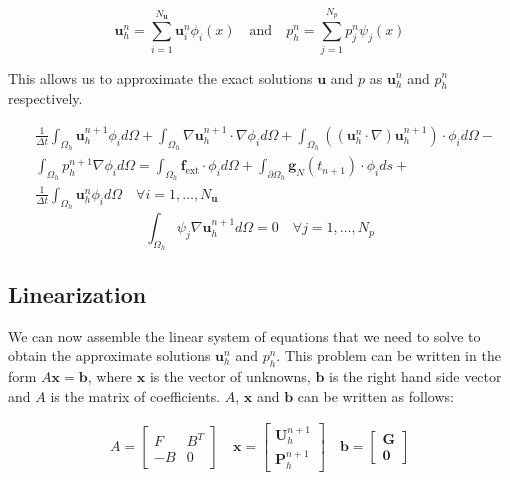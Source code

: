\begin{equation}
    \mathbf{u}^n_h = \sum_{i=1}^{N_{\mathbf{u}}} \mathbf{u}_i^n \phi_i(x) \quad \text{and} \quad p^n_h = \sum_{j=1}^{N_p} p_j^n \psi_j(x)
\end{equation}

This allows us to approximate the exact solutions $\mathbf{u}$ and $p$ as $\mathbf{u}^n_h$ and $p^n_h$ respectively.


\begin{equation}
    \begin{split}
        & \frac{1}{\Delta t} \int_{\Omega_h} \mathbf{u}^{n+1}_h \phi_i d \Omega + \int_{\Omega_h} \nabla \mathbf{u}^{n+1}_h \cdot \nabla \phi_i d \Omega + \int_{\Omega_h} ((\mathbf{u}^n_h \cdot \nabla) \mathbf{u}^{n+1}_h) \cdot \phi_i d \Omega - \\
        & \int_{\Omega_h} p^{n+1}_h \nabla \phi_i d \Omega = \int_{\Omega_h} \mathbf{f}_{\text{ext}} \cdot \phi_i d \Omega + \int_{\partial \Omega_h} \mathbf{g}_N(t_{n+1}) \cdot \phi_i d s + \\
        & \frac{1}{\Delta t} \int_{\Omega_h} \mathbf{u}^n_h \phi_i d \Omega \quad \forall i = 1, \dots, N_{\mathbf{u}}
    \end{split}
\end{equation}
\begin{equation}
    \int_{\Omega_h} \psi_j \nabla \mathbf{u}^{n+1}_h d \Omega = 0 \quad \forall j = 1, \dots, N_p
\end{equation}

\subsection{Linearization}

We can now assemble the linear system of equations that we need to solve to obtain the approximate solutions $\mathbf{u}^n_h$ and $p^n_h$.
This problem can be written in the form $A \mathbf{x} = \mathbf{b}$, where $\mathbf{x}$ is the vector of unknowns, $\mathbf{b}$ is the right hand side vector and $A$ is the matrix of coefficients. $A$, $\mathbf{x}$ and $\mathbf{b}$ can be written as follows:

$$
\begin{matrix}
    A = \begin{bmatrix}
        F & B^T \\
        -B & 0
    \end{bmatrix} \quad
    \mathbf{x} = \begin{bmatrix}
        \mathbf{U}^{n+1}_h \\
        \mathbf{P}^{n+1}_h
    \end{bmatrix} \quad
    \mathbf{b} = \begin{bmatrix}
        \mathbf{G} \\
        \mathbf{0}
    \end{bmatrix}
\end{matrix}
$$

